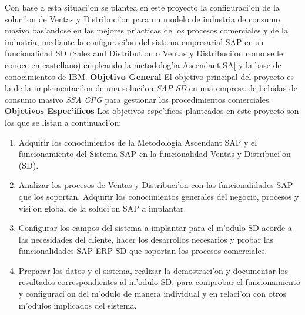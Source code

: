 		Con base a esta situaci'on se plantea en este proyecto la configuraci'on de la soluci'on de Ventas y Distribuci'on para un modelo de industria de consumo masivo bas'andose en las mejores pr'acticas de los procesos comerciales y de la industria, mediante la configuraci'on del sistema empresarial SAP en su funcionalidad SD (Sales and Distribution o Ventas y Distribuci'on como se le conoce en castellano) empleando la metodolog'ia Ascendant SA[ y la base de conocimientos de IBM.
\newline
\label{sect:objetivo_general}
\newline
\textbf{Objetivo General}
\newline
\newline
\indent El objetivo principal del proyecto es la de la implementaci'on de una soluci'on \emph{SAP SD} en una empresa de bebidas de consumo masivo \emph{SSA CPG} para gestionar los procedimientos comerciales. 
\newline
\newline
\label{sect:objetivos_especificos}
\textbf{Objetivos Espec'ificos}
\newline
\newline
 Los objetivos espe'ificos planteados en este proyecto son los que se listan a continuaci'on:
\begin{enumerate}
\item Adquirir los conocimientos de la Metodología Ascendant SAP y el funcionamiento del Sistema SAP en la funcionalidad Ventas y Distribuci'on (SD).

\item Analizar los procesos de Ventas y Distribuci'on con las funcionalidades SAP que los soportan. Adquirir los conocimientos generales del negocio, procesos y visi'on global de la soluci'on SAP a implantar.

\item Configurar los campos del sistema a implantar para el m'odulo SD acorde a las necesidades del cliente, hacer los desarrollos necesarios y probar las funcionalidades SAP ERP SD que soportan los procesos comerciales.

\item Preparar los datos y el sistema, realizar la demostraci'on y documentar los resultados correspondientes al m'odulo SD, para comprobar el funcionamiento y configuraci'on del m'odulo de manera individual y en relaci'on con otros m'odulos implicados del sistema.

\end{enumerate}





